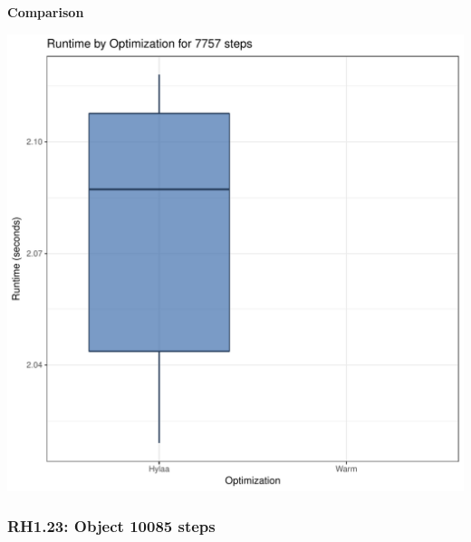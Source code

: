 \documentclass{article}\usepackage[]{graphicx}\usepackage[]{color}
\makeatletter
\def\maxwidth{ %
  \ifdim\Gin@nat@width>\linewidth
    \linewidth
  \else
    \Gin@nat@width
  \fi
}
\newenvironment{knitrout}{}{} %
\makeatother
\begin{document}
 \textbf{Comparison}
  
\begin{knitrout}
\color{fgcolor}
\includegraphics[width=\maxwidth]{figure/RH1_steps7757-1} 

\end{knitrout}


\subsubsection{RH1.23: Object 10085 steps}
\end{document}
